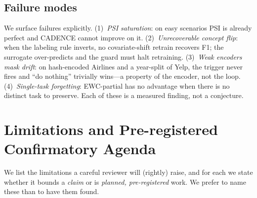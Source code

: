 \documentclass[conference]{IEEEtran}
\begin{document}
\subsection{Failure modes}\label{sec:failures}
We surface failures explicitly. (1)~\emph{PSI saturation}: on easy
scenarios PSI is already perfect and CADENCE cannot improve on it.
(2)~\emph{Unrecoverable concept flip}: when the labeling rule inverts, no
covariate-shift retrain recovers F1; the surrogate over-predicts and the
guard must halt retraining. (3)~\emph{Weak encoders mask drift}: on
hash-encoded Airlines and a year-split of Yelp, the trigger never fires
and ``do nothing'' trivially wins---a property of the encoder, not the
loop. (4)~\emph{Single-task forgetting}: EWC-partial has no advantage when
there is no distinct task to preserve. Each of these is a measured
finding, not a conjecture.

\section{Limitations and Pre-registered Confirmatory Agenda}\label{sec:limits}
We list the limitations a careful reviewer will (rightly) raise, and for
each we state whether it bounds a \emph{claim} or is \emph{planned,
pre-registered} work. We prefer to name these than to have them found.
\end{document}

